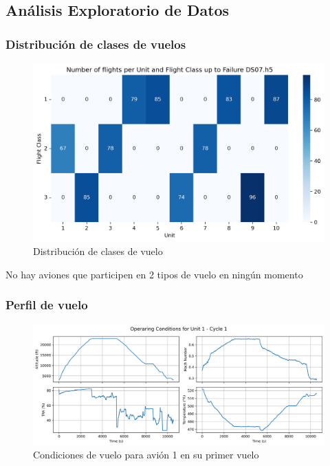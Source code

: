 \documentclass{beamer}
\begin{document}
        \subsection{Análisis Exploratorio de Datos}

        \begin{frame}
            \frametitle{Distribución de clases de vuelos}
            \begin{figure}[!htbp]
                \centering
                \includegraphics[scale=0.4]{fligt_class_per_unit_DS07.h5.png}
                \caption{Distribución de clases de vuelo}
            \end{figure}

            No hay aviones que participen en 2 tipos de vuelo en ningún momento
        \end{frame}

        \begin{frame}
            \frametitle{Perfil de vuelo}
            \begin{figure}[!htbp]
                \centering
                \includegraphics[scale=0.4]{operating_conditions_unit_1_cycle_1.png}
                \caption{Condiciones de vuelo para avión 1 en su primer vuelo}
            \end{figure}
        \end{frame}
\end{document}
